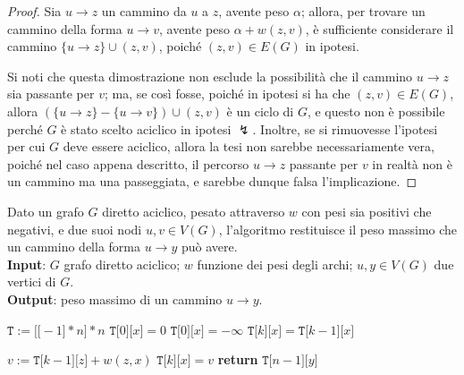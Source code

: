 \documentclass[14pt]{extreport}
\theoremstyle{definition}
\theoremstyle{definition}
\begin{document}
\begin{proof}
    Sia $u \rightarrow z$ un cammino da $u$ a $z$, avente peso $\alpha$; allora, per trovare un cammino della forma $u \rightarrow v$, avente peso $\alpha + w(z, v)$, è sufficiente considerare il cammino $\{u \rightarrow z\} \cup (z, v)$, poiché $(z, v) \in E(G)$ in ipotesi.

    Si noti che questa dimostrazione non esclude la possibilità che il cammino $u \rightarrow z$ sia passante per $v$; ma, se così fosse, poiché in ipotesi si ha che $(z, v) \in E(G)$, allora $(\{u \rightarrow z\} - \{u \rightarrow v\}) \cup (z, v)$ è un ciclo di $G$, e questo non è possibile perché $G$ è stato scelto aciclico in ipotesi $\lightning$. Inoltre, se si rimuovesse l'ipotesi per cui $G$ deve essere aciclico, allora la tesi non sarebbe necessariamente vera, poiché nel caso appena descritto, il percorso $u \rightarrow z$ passante per $v$ in realtà non è un cammino ma una passeggiata, e sarebbe dunque falsa l'implicazione.
\end{proof}

\begin{algorithm}[H]
    \caption{
        Dato un grafo $G$ diretto aciclico, pesato attraverso $w$ con pesi sia positivi che negativi, e due suoi nodi $u, v \in V(G)$, l'algoritmo restituisce il peso massimo che un cammino della forma $u \rightarrow y$ può avere.\\
        \textbf{Input}: $G$ grafo diretto aciclico; $w$ funzione dei pesi degli archi; $u, y \in V(G)$ due vertici di $G$.\\
        \textbf{Output}: peso massimo di un cammino $u \rightarrow y$.
    }

    \begin{algorithmic}[1]
        \label{maxWeightPaths}
            \State $\texttt{T} := \texttt{[[}-1\texttt{]} * n \texttt{]} * n$
                    \State $\texttt{T[}0\texttt{][}x\texttt{]} = 0$
                \Else
                    \State $\texttt{T[}0\texttt{][}x\texttt{]} = - \infty$
                \EndIf
            \EndFor
                    \State $\texttt{T[}k\texttt{][}x\texttt{]} = \texttt{T[}k -1 \texttt{][}x\texttt{]}$ 

                     
                        \State $v := \texttt{T[}k-1\texttt{][}z\texttt{]} + w(z, x)$
                            \State $\texttt{T[}k\texttt{][}x\texttt{]} = v$
                        \EndIf
                    \EndFor
                \EndFor
            \EndFor
            \State \textbf{return} $\texttt{T[}n- 1\texttt{][}y\texttt{]}$
        \EndFunction
    \end{algorithmic}
\end{algorithm}
\end{document}
